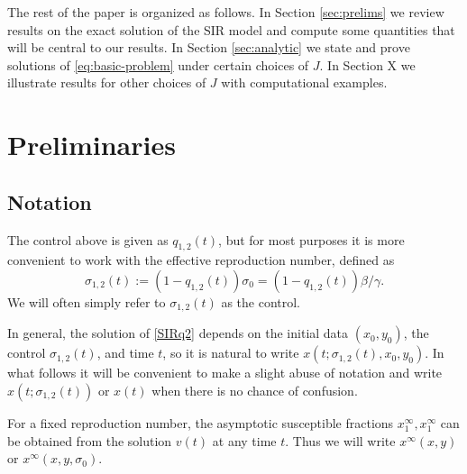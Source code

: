 \documentclass[english,12pt,letter]{article}
\newcommand{\Rnot}{\sigma_0}
\newcommand{\xinf}{x^\infty}
\newcommand{\xoneinf}{x_1^\infty}
\newcommand{\xtwoinf}{x_1^\infty}
\begin{document}
The rest of the paper is organized as follows.  In Section \ref{sec:prelims} we
review results on the exact solution of the SIR model and compute some quantities
that will be central to our results.  In Section \ref{sec:analytic} we state
and prove solutions of \eqref{eq:basic-problem} under certain choices of $J$.
In Section X we illustrate results for other choices of $J$ with computational
examples.

\section{Preliminaries\label{sec:prelims}}

\subsection{Notation}
The control above is given as $q_{1,2}(t)$, but for most purposes it is more
convenient to work with the effective reproduction number, defined as
$$
    \sigma_{1,2}(t) := (1-q_{1,2}(t))\Rnot = (1-q_{1,2}(t))\beta/\gamma.
$$
We will often simply refer to $\sigma_{1,2}(t)$ as the control.

In general, the solution of \eqref{SIRq2} depends on the initial data
$(x_0,y_0)$, the control $\sigma_{1,2}(t)$, and time $t$, so it is natural to write
$x(t;\sigma_{1,2}(t),x_0,y_0)$.
In what follows it will be convenient to make a slight abuse of notation and
write $x(t;\sigma_{1,2}(t))$ or $x(t)$ when there is no chance of confusion.

For a fixed reproduction number, the asymptotic susceptible fractions $\xoneinf, \xtwoinf$
can be obtained from the solution $v(t)$ at any time $t$.
Thus we will write $\xinf(x,y)$ or $\xinf(x,y,\Rnot)$.
\end{document}
